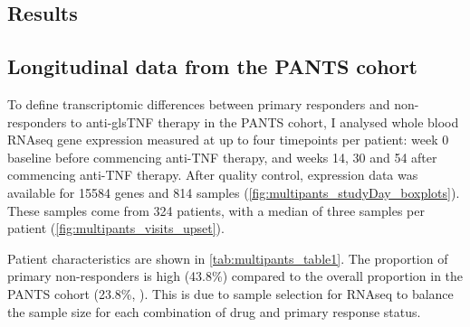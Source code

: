 \begin{outline}

\section{Results}

\subsection{Longitudinal  data from the \gls{PANTS} cohort}

To define transcriptomic differences between primary responders and non-responders to anti-gls{TNF} therapy in the \gls{PANTS} cohort, 
I analysed whole blood \gls{RNAseq} gene expression measured at up to four timepoints per patient:
week 0 baseline before commencing anti-\gls{TNF} therapy, and weeks 14, 30 and 54 after commencing anti-\gls{TNF} therapy.
After quality control, expression data was available for 15584 genes and 814 samples (\autoref{fig:multipants_studyDay_boxplots}).
These samples come from 324 patients, with a median of three samples per patient (\autoref{fig:multipants_visits_upset}).

Patient characteristics are shown in \autoref{tab:multipants_table1}.
The proportion of primary non-responders is high (43.8\%) compared to the overall proportion in the \gls{PANTS} cohort (23.8\%, \autocite{kennedy2019PredictorsAntiTNFTreatment}).
This is due to sample selection for \gls{RNAseq} to balance the sample size for each combination of drug and primary response status.


\end{outline}
